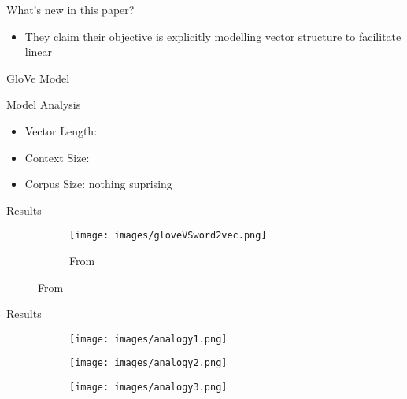 \begin{frame}{What's new in this paper?}
  \begin{itemize}
  \item They claim their objective is explicitly modelling vector structure to facilitate linear 
  \end{itemize}
\end{frame}

\begin{frame}{GloVe Model}
\end{frame}


\begin{frame}{Model Analysis}
  \begin{itemize}
  \item Vector Length:
  \item Context Size: 
  \item Corpus Size: nothing suprising
  \end{itemize}
\end{frame}

\begin{frame}{Results}
  \begin{figure}
    \begin{figure}
      \texttt{[image: images/gloveVSword2vec.png]}
      \caption{From}
    \end{figure}
  \end{figure}
\end{frame}

\begin{frame}{Results}
  \begin{figure}
    \centering
    \begin{subfigure}[b]{0.33\textwidth}
      \texttt{[image: images/analogy1.png]}
    \end{subfigure}%
    \begin{subfigure}[b]{0.33\textwidth}
      \texttt{[image: images/analogy2.png]}
    \end{subfigure}%
    \begin{subfigure}[b]{0.33\textwidth}
      \texttt{[image: images/analogy3.png]}
    \end{subfigure}%
  \end{figure}
\end{frame}
